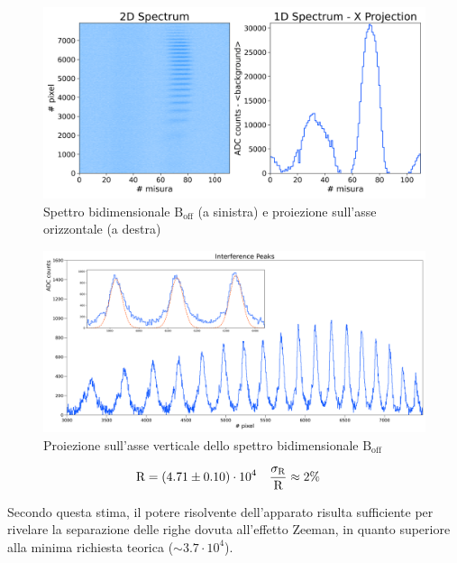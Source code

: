 \documentclass[twocolumn,10pt]{asme2ej}
\begin{document}
\begin{figure}
    \centering
    \includegraphics[width=\linewidth]{../Plots/Boff_2d_spectrum.png}
    \caption{Spettro bidimensionale $\text{B}_{\text{off}}$ (a sinistra) e proiezione sull'asse orizzontale (a destra)}
    \label{i:spettro2d_Boff}
    \vspace{-10pt}
\end{figure}

\begin{figure}
    \centering
    \includegraphics[width=\textwidth]{../Plots/Boff_Y_proj.png}
   \caption{Proiezione sull'asse verticale dello spettro bidimensionale $\text{B}_{\text{off}}$}
    \label{i:spettro2d_Boff_ProjY}
\end{figure}

\vspace{-15pt}
\begin{align*}
    \text{R} &= (4.71 \pm 0.10)\cdot 10^4  & \frac{\sigma_{\text{R}}}{\text{R}} &\approx 2\%
    \label{e:R_result}
    \vspace{-10pt}
\end{align*}


Secondo questa stima, il potere risolvente dell'apparato risulta sufficiente per rivelare la separazione delle righe
dovuta all'effetto Zeeman, in quanto superiore alla minima richiesta teorica ($\sim 3.7 \cdot 10^4$). 
\end{document}
